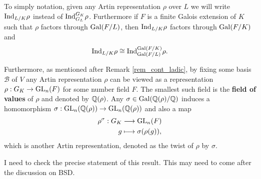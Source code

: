 To simply notation, given any Artin representation $\rho$ over $L$ we will write $\mathrm{Ind}_{L/K}\rho$ instead of $\mathrm{Ind}_{G_L}^{G_K}\rho$. Furthermore if $F$ is a finite Galois extension of $K$ such that $\rho$ factors through $\mathrm{Gal}(F/L)$, then $\mathrm{Ind}_{L/K}\rho$ factors through $\mathrm{Gal}(F/K)$ and 
$$\mathrm{Ind}_{L/K}\rho\cong\mathrm{Ind}_{\mathrm{Gal}(F/L)}^{\mathrm{Gal}(F/K)}\rho.$$

Furthermore, as mentioned after Remark \ref{rem_cont_ladic}, by fixing some basis $\mathcal{B}$ of $V$ any Artin representation $\rho$ can be viewed as a representation $\rho:G_K\to\mathrm{GL}_n(F)$ for some number field $F$. The smallest such field is the \textbf{field of values} of $\rho$ and denoted by $\mathbb{Q}(\rho)$. Any $\sigma\in\mathrm{Gal}(\mathbb{Q}(\rho)/\mathbb{Q})$ induces a homomorphism $\sigma:\mathrm{GL}_n(\mathbb{Q}(\rho))\to\mathrm{GL}_n(\mathbb{Q}(\rho))$ and also a map
\begin{align*}
    \rho^\sigma:G_K &\longrightarrow\mathrm{GL}_n(F)\\
    g&\longmapsto \sigma(\rho(g)),
\end{align*}
which is another Artin representation, denoted as the twist of $\rho$ by $\sigma$.

\begin{conj}
    I need to check the precise statement of this result. This may need to come after the discussion on BSD.
\end{conj}
